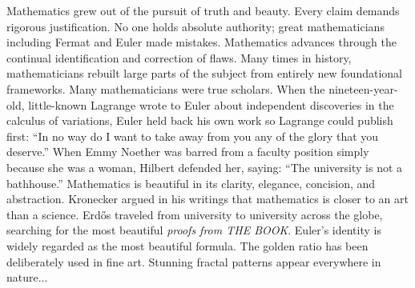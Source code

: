 \documentclass[b5paper]{article}
\begin{document}
Mathematics grew out of the pursuit of truth and beauty. Every claim demands rigorous justification. No one holds absolute authority; great mathematicians including Fermat and Euler made mistakes. Mathematics advances through the continual identification and correction of flaws. Many times in history, mathematicians rebuilt large parts of the subject from entirely new foundational frameworks. Many mathematicians were true scholars. When the nineteen-year-old, little-known Lagrange wrote to Euler about independent discoveries in the calculus of variations, Euler held back his own work so Lagrange could publish first: “In no way do I want to take away from you any of the glory that you deserve.” When Emmy Noether was barred from a faculty position simply because she was a woman, Hilbert defended her, saying: “The university is not a bathhouse.” Mathematics is beautiful in its clarity, elegance, concision, and abstraction. Kronecker argued in his writings that mathematics is closer to an art than a science. Erdős traveled from university to university across the globe, searching for the most beautiful \emph{proofs from THE BOOK}. Euler's identity is widely regarded as the most beautiful formula. The golden ratio has been deliberately used in fine art. Stunning fractal patterns appear everywhere in nature...
\end{document}
